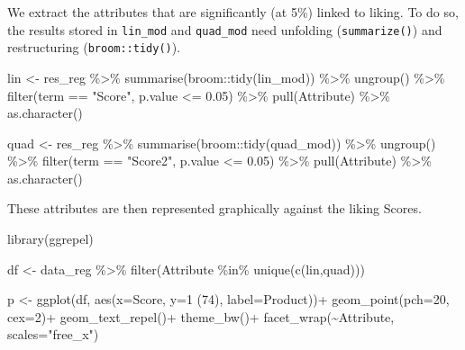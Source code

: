 \documentclass[
]{book}
\newenvironment{Shaded}{\begin{snugshade}}{\end{snugshade}}
\newcommand{\AttributeTok}[1]{\textcolor[rgb]{0.77,0.63,0.00}{#1}}
\newcommand{\DecValTok}[1]{\textcolor[rgb]{0.00,0.00,0.81}{#1}}
\newcommand{\FloatTok}[1]{\textcolor[rgb]{0.00,0.00,0.81}{#1}}
\newcommand{\FunctionTok}[1]{\textcolor[rgb]{0.00,0.00,0.00}{#1}}
\newcommand{\NormalTok}[1]{#1}
\newcommand{\OtherTok}[1]{\textcolor[rgb]{0.56,0.35,0.01}{#1}}
\newcommand{\SpecialCharTok}[1]{\textcolor[rgb]{0.00,0.00,0.00}{#1}}
\newcommand{\StringTok}[1]{\textcolor[rgb]{0.31,0.60,0.02}{#1}}
\begin{document}
We extract the attributes that are significantly (at 5\%) linked to liking. To do so, the results stored in \texttt{lin\_mod} and \texttt{quad\_mod} need unfolding (\texttt{summarize()}) and restructuring (\texttt{broom::tidy()}).

\begin{Shaded}
\begin{Highlighting}[]
\NormalTok{lin }\OtherTok{\textless{}{-}}\NormalTok{ res\_reg }\SpecialCharTok{\%\textgreater{}\%} 
  \FunctionTok{summarise}\NormalTok{(broom}\SpecialCharTok{::}\FunctionTok{tidy}\NormalTok{(lin\_mod)) }\SpecialCharTok{\%\textgreater{}\%} 
  \FunctionTok{ungroup}\NormalTok{() }\SpecialCharTok{\%\textgreater{}\%} 
  \FunctionTok{filter}\NormalTok{(term }\SpecialCharTok{==} \StringTok{"Score"}\NormalTok{, p.value }\SpecialCharTok{\textless{}=} \FloatTok{0.05}\NormalTok{) }\SpecialCharTok{\%\textgreater{}\%} 
  \FunctionTok{pull}\NormalTok{(Attribute) }\SpecialCharTok{\%\textgreater{}\%} 
  \FunctionTok{as.character}\NormalTok{()}

\NormalTok{quad }\OtherTok{\textless{}{-}}\NormalTok{ res\_reg }\SpecialCharTok{\%\textgreater{}\%} 
  \FunctionTok{summarise}\NormalTok{(broom}\SpecialCharTok{::}\FunctionTok{tidy}\NormalTok{(quad\_mod)) }\SpecialCharTok{\%\textgreater{}\%} 
  \FunctionTok{ungroup}\NormalTok{() }\SpecialCharTok{\%\textgreater{}\%} 
  \FunctionTok{filter}\NormalTok{(term }\SpecialCharTok{==} \StringTok{"Score2"}\NormalTok{, p.value }\SpecialCharTok{\textless{}=} \FloatTok{0.05}\NormalTok{) }\SpecialCharTok{\%\textgreater{}\%}
  \FunctionTok{pull}\NormalTok{(Attribute) }\SpecialCharTok{\%\textgreater{}\%} 
  \FunctionTok{as.character}\NormalTok{()}
\end{Highlighting}
\end{Shaded}

These attributes are then represented graphically against the liking Scores.

\begin{Shaded}
\begin{Highlighting}[]
\FunctionTok{library}\NormalTok{(ggrepel)}

\NormalTok{df }\OtherTok{\textless{}{-}}\NormalTok{ data\_reg }\SpecialCharTok{\%\textgreater{}\%} 
  \FunctionTok{filter}\NormalTok{(Attribute }\SpecialCharTok{\%in\%} \FunctionTok{unique}\NormalTok{(}\FunctionTok{c}\NormalTok{(lin,quad)))}

\NormalTok{p }\OtherTok{\textless{}{-}} \FunctionTok{ggplot}\NormalTok{(df, }\FunctionTok{aes}\NormalTok{(}\AttributeTok{x=}\NormalTok{Score, }\AttributeTok{y=}\StringTok{\textasciigrave{}}\AttributeTok{1 (74)}\StringTok{\textasciigrave{}}\NormalTok{, }\AttributeTok{label=}\NormalTok{Product))}\SpecialCharTok{+}
  \FunctionTok{geom\_point}\NormalTok{(}\AttributeTok{pch=}\DecValTok{20}\NormalTok{, }\AttributeTok{cex=}\DecValTok{2}\NormalTok{)}\SpecialCharTok{+}
  \FunctionTok{geom\_text\_repel}\NormalTok{()}\SpecialCharTok{+}
  \FunctionTok{theme\_bw}\NormalTok{()}\SpecialCharTok{+}
  \FunctionTok{facet\_wrap}\NormalTok{(}\SpecialCharTok{\textasciitilde{}}\NormalTok{Attribute, }\AttributeTok{scales=}\StringTok{"free\_x"}\NormalTok{)}
\end{Highlighting}
\end{Shaded}
\end{document}
